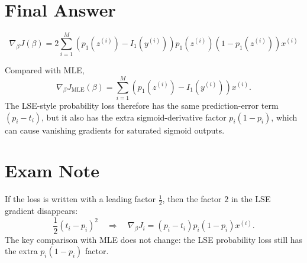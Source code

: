 \documentclass[11pt]{article}
\begin{document}
\section*{Final Answer}

\[
    \boxed{
    \nabla_\beta J(\beta)
    =
    2\sum_{i=1}^{M}
    \left(p_1(z^{(i)})-I_1(y^{(i)})\right)
    p_1(z^{(i)})\left(1-p_1(z^{(i)})\right)x^{(i)}
    }
\]

Compared with MLE,
\[
    \boxed{
    \nabla_\beta J_{\text{MLE}}(\beta)
    =
    \sum_{i=1}^{M}
    \left(p_1(z^{(i)})-I_1(y^{(i)})\right)x^{(i)}
    }.
\]
The LSE-style probability loss therefore has the same prediction-error term
\((p_i-t_i)\), but it also has the extra sigmoid-derivative factor
\(p_i(1-p_i)\), which can cause vanishing gradients for saturated sigmoid outputs.

\section*{Exam Note}

If the loss is written with a leading factor \(\tfrac12\), then the factor \(2\)
in the LSE gradient disappears:
\[
    \frac{1}{2}(t_i-p_i)^2
    \quad\Rightarrow\quad
    \nabla_\beta J_i
    =
    (p_i-t_i)p_i(1-p_i)x^{(i)}.
\]
The key comparison with MLE does not change: the LSE probability loss still has
the extra \(p_i(1-p_i)\) factor.
\end{document}
